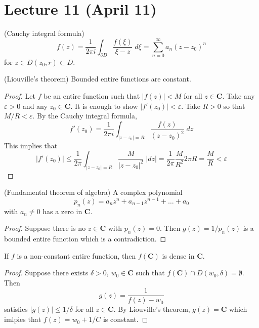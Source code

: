 \section{Lecture 11 (April 11)}
\begin{recall}
(Cauchy integral formula)
\[f(z)=\dfrac{1}{2\pi i}\int _{\partial D}\dfrac{f(\xi )}{\xi -z}\;d\xi =\sum ^{\infty }_{n=0}a_{n}(z-z_0)^{n}\]
for $z\in D(z_0,r)\subset D$.
\end{recall}
\vspace{2ex}
\begin{thm}
(Liouville's theorem) Bounded entire functions are constant.
\end{thm}
\vspace{2ex}
\begin{proof}
Let $f$ be an entire function such that $|f(z)|<M$ for all $z\in {\bm C}$. Take any $\varepsilon >0$ and any $z_0\in {\bm C}$. It is enough to show $|f'(z_0)|<\varepsilon $. Take $R>0$ so that $M/R<\varepsilon $. By the Cauchy integral formula, 
\[f'(z_0)=\dfrac{1}{2\pi i}\int _{|z-z_0|=R}\dfrac{f(z)}{(z-z_0)^2}\;dz\]
This implies that
\[|f'(z_0)|\leq \dfrac{1}{2\pi }\int _{|z-z_0|=R}\dfrac{M}{|z-z_0|^2}\;|dz|=\dfrac{1}{2\pi }\dfrac{M}{R^2}2\pi R=\dfrac{M}{R}<\varepsilon \]
\end{proof}
\vspace{2ex}
\begin{thm}
(Fundamental theorem of algebra) A complex polynomial
\[p_{n}(z)=a_{n}z^{n}+a_{n-1}z^{n-1}+\ldots +a_0\]
with $a_{n}\ne 0$ has a zero in ${\bm C}$.
\end{thm}
\vspace{2ex}
\begin{proof}
Suppose there is no $z\in {\bm C}$ with $p_{n}(z)=0$. Then $g(z)=1/p_{n}(z)$ is a bounded entire function which is a contradiction.
\end{proof}
\vspace{2ex}
\begin{cor}
If $f$ is a non-constant entire function, then $f({\bm C})$ is dense in ${\bm C}$.
\end{cor}
\vspace{2ex}
\begin{proof}
Suppose there exists $\delta >0$, $w_0\in {\bm C}$ such that $f({\bm C})\cap D(w_0,\delta )=\emptyset$. Then 
\[g(z)=\dfrac{1}{f(z)-w_0}\]
satisfies $|g(z)|\leq 1/\delta $ for all $z\in {\bm C}$. By Liouville's theorem, $g(z)={\bm C}$ which imlpies that $f(z)=w_0+1/C$ is constant.
\end{proof}
\vspace{2ex}
